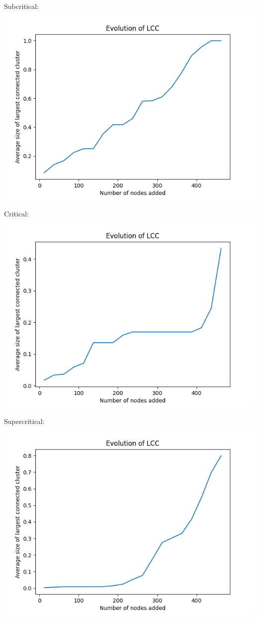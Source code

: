 \documentclass[11pt]{article}
\begin{document}
Subcritical: \\
\includegraphics[scale=0.5]{nevol.png}

Critical:\\
\includegraphics[scale=0.5]{nevolc.png}

Supercritical:\\
\includegraphics[scale=0.5]{nevolsupc.png}
\end{document}
